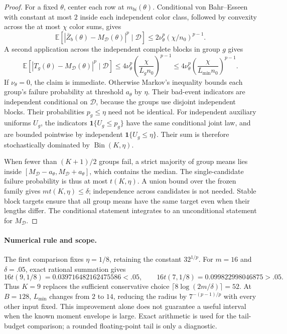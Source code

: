 \begin{proof}
For a fixed $\theta$, center each row at $m_{bi}(\theta)$. Conditional
von Bahr--Esseen with constant at most $2$ inside each independent color class,
followed by convexity across the at most $\chi$ color sums, gives
\[
 \mathbb E[|\bar Z_b(\theta)-M_{\mathcal D}(\theta)|^p\mid\mathcal D]
 \le2\nu_\theta^p(\chi/n_0)^{p-1}.
\]
A second application across the independent complete blocks in group $g$ gives
\[
 \mathbb E[|T_g(\theta)-M_{\mathcal D}(\theta)|^p\mid\mathcal D]
 \le4\nu_\theta^p
       \left(\frac{\chi}{L_gn_0}\right)^{p-1}
 \le4\nu_\theta^p
       \left(\frac{\chi}{L_{\min}n_0}\right)^{p-1}.
\]
If $\nu_\theta=0$, the claim is immediate. Otherwise Markov's inequality
bounds each group's failure probability at threshold $a_\theta$ by $\eta$.
Their bad-event indicators are independent conditional on $\mathcal D$,
because the groups use disjoint independent blocks. Their probabilities
$p_g\le\eta$ need not be identical. For independent auxiliary uniforms $U_g$,
the indicators $\mathbf1\{U_g\le p_g\}$ have the same conditional joint law,
and are bounded pointwise by independent $\mathbf1\{U_g\le\eta\}$.
Their sum is therefore stochastically dominated by $\operatorname{Bin}(K,\eta)$.

When fewer than $(K+1)/2$ groups fail, a strict majority of group means lies
inside $[M_{\mathcal D}-a_\theta,M_{\mathcal D}+a_\theta]$, which contains
the median. The single-candidate failure probability is thus at most
$t(K,\eta)$. A union bound over the frozen family gives $m t(K,\eta)\le\delta$;
independence across candidates is not needed. Stable block targets ensure
that all group means have the same target even when their lengths differ.
The conditional statement integrates to an unconditional statement for
$M_{\mathcal D}$.
\end{proof}

\paragraph{Numerical rule and scope.}
The first comparison fixes $\eta=1/8$, retaining the constant $32^{1/p}$.
For $m=16$ and $\delta=.05$, exact rational summation gives
\[
 16t(9,1/8)=0.039716482162475586<.05,
 \qquad 16t(7,1/8)=0.099822998046875>.05.
\]
Thus $K=9$ replaces the sufficient conservative choice
$\lceil8\log(2m/\delta)\rceil=52$. At $B=128$, $L_{\min}$ changes from $2$
to $14$, reducing the radius by $7^{-(p-1)/p}$ with every other input fixed.
This improvement alone does not guarantee a useful interval when the known
moment envelope is large. Exact arithmetic is used for the tail-budget
comparison; a rounded floating-point tail is only a diagnostic.

